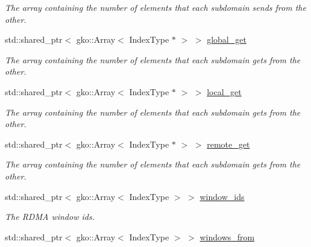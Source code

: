 \begin{DoxyCompactItemize}
\begin{DoxyCompactList}\small\item\em The array containing the number of elements that each subdomain sends from the other. \end{DoxyCompactList}\item 
std\+::shared\+\_\+ptr$<$ gko\+::\+Array$<$ Index\+Type $\ast$ $>$ $>$ \hyperlink{structschwz_1_1Communicate_1_1comm__struct_a4166e2bb75eeaf48ee39ca7cdc3adb01}{global\+\_\+get}
\begin{DoxyCompactList}\small\item\em The array containing the number of elements that each subdomain gets from the other. \end{DoxyCompactList}\item 
std\+::shared\+\_\+ptr$<$ gko\+::\+Array$<$ Index\+Type $\ast$ $>$ $>$ \hyperlink{structschwz_1_1Communicate_1_1comm__struct_ab4e91a457646f43106da98a58c332754}{local\+\_\+get}
\begin{DoxyCompactList}\small\item\em The array containing the number of elements that each subdomain gets from the other. \end{DoxyCompactList}\item 
std\+::shared\+\_\+ptr$<$ gko\+::\+Array$<$ Index\+Type $\ast$ $>$ $>$ \hyperlink{structschwz_1_1Communicate_1_1comm__struct_a70f57e5c0ab445089ca9d8bdc0fa3838}{remote\+\_\+get}
\begin{DoxyCompactList}\small\item\em The array containing the number of elements that each subdomain gets from the other. \end{DoxyCompactList}\item 
\mbox{\label{structschwz_1_1Communicate_1_1comm__struct_a179dd67dc2d6ea4b71a6d5964cac18c6}} 
std\+::shared\+\_\+ptr$<$ gko\+::\+Array$<$ Index\+Type $>$ $>$ \hyperlink{structschwz_1_1Communicate_1_1comm__struct_a179dd67dc2d6ea4b71a6d5964cac18c6}{window\+\_\+ids}
\begin{DoxyCompactList}\small\item\em The R\+D\+MA window ids. \end{DoxyCompactList}\item 
\mbox{\label{structschwz_1_1Communicate_1_1comm__struct_a167c62a1a0cf2be8351e1ab65a264cf2}} 
std\+::shared\+\_\+ptr$<$ gko\+::\+Array$<$ Index\+Type $>$ $>$ \hyperlink{structschwz_1_1Communicate_1_1comm__struct_a167c62a1a0cf2be8351e1ab65a264cf2}{windows\+\_\+from}

\end{DoxyCompactItemize}
